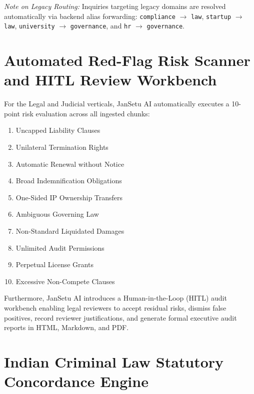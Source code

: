 \documentclass[12pt,a4paper,oneside]{report}
\begin{document}
\noindent\textit{Note on Legacy Routing:} Inquiries targeting legacy domains are resolved automatically via backend alias forwarding: \texttt{compliance} $\to$ \texttt{law}, \texttt{startup} $\to$ \texttt{law}, \texttt{university} $\to$ \texttt{governance}, and \texttt{hr} $\to$ \texttt{governance}.

\section{Automated Red-Flag Risk Scanner and HITL Review Workbench}
For the Legal and Judicial verticals, JanSetu AI automatically executes a 10-point risk evaluation across all ingested chunks:
\begin{enumerate}[itemsep=1pt]
    \item Uncapped Liability Clauses
    \item Unilateral Termination Rights
    \item Automatic Renewal without Notice
    \item Broad Indemnification Obligations
    \item One-Sided IP Ownership Transfers
    \item Ambiguous Governing Law
    \item Non-Standard Liquidated Damages
    \item Unlimited Audit Permissions
    \item Perpetual License Grants
    \item Excessive Non-Compete Clauses
\end{enumerate}

Furthermore, JanSetu AI introduces a Human-in-the-Loop (HITL) audit workbench enabling legal reviewers to accept residual risks, dismiss false positives, record reviewer justifications, and generate formal executive audit reports in HTML, Markdown, and PDF.

\section{Indian Criminal Law Statutory Concordance Engine}
\end{document}
